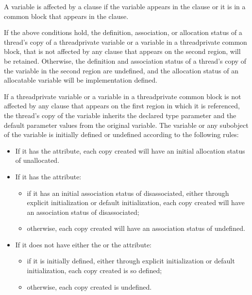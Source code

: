 \begin{fortranspecific}
A variable is affected by a  clause if the variable appears in the  clause
or it is in a common block that appears in the  clause.

If the above conditions hold, the definition, association, or allocation status of a thread's
copy of a threadprivate variable or a variable in a threadprivate common
block, that is not affected by any  clause that appears on the second region, will
be retained. Otherwise, the definition and association status of a thread's copy of the
variable in the second region are undefined, and the allocation status of an allocatable
variable will be implementation defined.

If a threadprivate variable or a variable in a threadprivate common block is
not affected by any  clause that appears on the first  region in which
it is referenced, the thread's copy of the variable inherits the
declared type parameter and the default parameter values from the
original variable.  The variable or any subobject of the variable is initially defined or
undefined according to the following rules:

\begin{itemize} %
\item If it has the  attribute, each copy created will have an initial
allocation status of unallocated.

\item If it has the  attribute:
\begin{itemize} %
\item if it has an initial association status of disassociated, either through explicit
initialization or default initialization, each copy created will have an association
status of disassociated;
\item otherwise, each copy created will have an association status of undefined.
\end{itemize} %


\item If it does not have either the  or the  attribute:

\begin{samepage}\begin{itemize} %
\item if it is initially defined, either through explicit initialization or default
initialization, each copy created is so defined;

\item otherwise, each copy created is undefined.
\end{itemize} %
\end{samepage}

\end{itemize} %
\end{fortranspecific}

